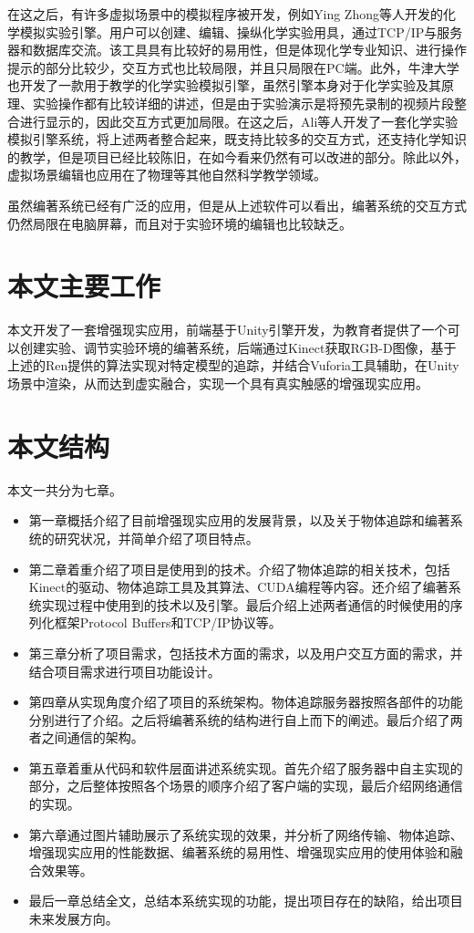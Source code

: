 在这之后，有许多虚拟场景中的模拟程序被开发，例如Ying Zhong等人开发的化学模拟实验引擎。\cite{zhong2014domain}用户可以创建、编辑、操纵化学实验用具，通过TCP/IP与服务器和数据库交流。该工具具有比较好的易用性，但是体现化学专业知识、进行操作提示的部分比较少，交互方式也比较局限，并且只局限在PC端。此外，牛津大学也开发了一款用于教学的化学实验模拟引擎，虽然引擎本身对于化学实验及其原理、实验操作都有比较详细的讲述，但是由于实验演示是将预先录制的视频片段整合进行显示的，因此交互方式更加局限。\cite{OxfordChe}在这之后，Ali等人开发了一套化学实验模拟引擎系统，\cite{ali2014effect}将上述两者整合起来，既支持比较多的交互方式，还支持化学知识的教学，但是项目已经比较陈旧，在如今看来仍然有可以改进的部分。除此以外，虚拟场景编辑也应用在了物理等其他自然科学教学领域。\cite{daineko2017using}

虽然编著系统已经有广泛的应用，但是从上述软件可以看出，编著系统的交互方式仍然局限在电脑屏幕，而且对于实验环境的编辑也比较缺乏。

\section{本文主要工作}
本文开发了一套增强现实应用，前端基于Unity引擎开发，为教育者提供了一个可以创建实验、调节实验环境的编著系统，后端通过Kinect获取RGB-D图像，基于上述的Ren提供的算法\cite{ren2017real}实现对特定模型的追踪，并结合Vuforia工具辅助，在Unity场景中渲染，从而达到虚实融合，实现一个具有真实触感的增强现实应用。


\section{本文结构}
本文一共分为七章。
\begin{itemize}[noitemsep,topsep=0pt,parsep=0pt,partopsep=0pt]
\item 第一章概括介绍了目前增强现实应用的发展背景，以及关于物体追踪和编著系统的研究状况，并简单介绍了项目特点。
\item 第二章着重介绍了项目是使用到的技术。介绍了物体追踪的相关技术，包括Kinect的驱动、物体追踪工具及其算法、CUDA编程等内容。还介绍了编著系统实现过程中使用到的技术以及引擎。最后介绍上述两者通信的时候使用的序列化框架Protocol Buffers和TCP/IP协议等。
\item 第三章分析了项目需求，包括技术方面的需求，以及用户交互方面的需求，并结合项目需求进行项目功能设计。
\item 第四章从实现角度介绍了项目的系统架构。物体追踪服务器按照各部件的功能分别进行了介绍。之后将编著系统的结构进行自上而下的阐述。最后介绍了两者之间通信的架构。
\item 第五章着重从代码和软件层面讲述系统实现。首先介绍了服务器中自主实现的部分，之后整体按照各个场景的顺序介绍了客户端的实现，最后介绍网络通信的实现。
\item 第六章通过图片辅助展示了系统实现的效果，并分析了网络传输、物体追踪、增强现实应用的性能数据、编著系统的易用性、增强现实应用的使用体验和融合效果等。
\item 最后一章总结全文，总结本系统实现的功能，提出项目存在的缺陷，给出项目未来发展方向。
\end{itemize}
